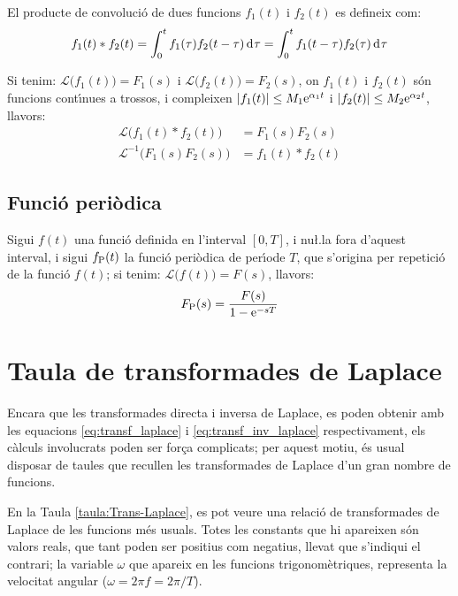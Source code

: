 El producte de convoluci\'{o} de dues funcions $f_1(t)$ i $f_2(t)$ es
defineix com:
\begin{equation}
    f_1(t) * f_2(t) = \int_0^t f_1(\tau) f_2(t-\tau) \diff\tau =
    \int_0^t f_1(t-\tau) f_2(\tau) \diff\tau
\end{equation}

Si tenim: $\mathcal{L} \bigl(f_1(t) \bigr) = F_1(s)$ i $\mathcal{L}
\bigl(f_2(t) \bigr) = F_2(s)$, on $f_1(t)$ i $f_2(t)$ s\'{o}n funcions
cont\'{\i}nues a trossos, i compleixen $|f_1(t)|\leq M_1\mathrm{e}^{\alpha_1 t}$
i $|f_2(t)|\leq M_2\mathrm{e}^{\alpha_2 t}$, llavors:
\begin{align}
    \mathcal{L} \bigl( f_1(t) * f_2(t) \bigr) &= F_1(s) F_2(s)\\
    \mathcal{L}^{-1} \bigl( F_1(s) F_2(s) \bigr) &= f_1(t) * f_2(t)
\end{align}

\subsection{Funci\'{o} peri\`{o}dica}

Sigui $f(t)$ una funci\'{o} definida en l'interval $[0,T]$, i nu{\l.l}a
fora d'aquest interval, i sigui $f_\mathrm{P}(t)$ la funci\'{o} peri\`{o}dica de
per\'{\i}ode $T$, que s'origina per repetici\'{o} de la funci\'{o} $f(t)$; si
tenim: $\mathcal{L} \bigl(f(t) \bigr) = F(s)$, llavors:
\begin{equation}
    F_\mathrm{P}(s) = \frac{F(s)}{1-\mathrm{e}^{-sT}}
\end{equation}

\section{Taula de transformades de Laplace}

Encara que les transformades directa i inversa de Laplace, es poden
obtenir amb les equacions \eqref{eq:transf_laplace} i
\eqref{eq:transf_inv_laplace} respectivament, els c\`{a}lculs
involucrats poden ser for\c{c}a complicats; per aquest motiu, \'{e}s usual
disposar de taules que recullen les transformades de Laplace d'un
gran nombre de funcions.

En la Taula \vref{taula:Trans-Laplace}, es pot veure una relaci\'{o} de
transformades de Laplace de les funcions m\'{e}s usuals. Totes les
constants que hi apareixen s\'{o}n valors reals, que tant poden ser
positius com negatius, llevat que s'indiqui el contrari; la variable
$\omega$ que apareix en les funcions trigonom\`{e}triques, representa la
velocitat angular ($\omega=2\pi f=2\pi/T$).

